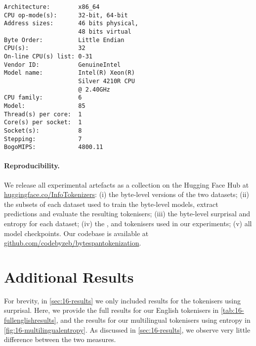 \begin{tcolorbox}[left=5pt,right=5pt,top=5pt,bottom=5pt]
    \small
    \begin{verbatim}
Architecture:        x86_64
CPU op-mode(s):      32-bit, 64-bit
Address sizes:       46 bits physical, 
                     48 bits virtual
Byte Order:          Little Endian
CPU(s):              32
On-line CPU(s) list: 0-31
Vendor ID:           GenuineIntel
Model name:          Intel(R) Xeon(R)
                     Silver 4210R CPU
                     @ 2.40GHz
CPU family:          6
Model:               85
Thread(s) per core:  1
Core(s) per socket:  1
Socket(s):           8
Stepping:            7
BogoMIPS:            4800.11
\end{verbatim}
\end{tcolorbox}


\paragraph{Reproducibility.}

We release all experimental artefacts as a collection on the Hugging Face Hub at \href{https://huggingface.co/InfoTokenizers}{huggingface.co/InfoTokenizers}: (i) the byte-level versions of the two datasets; (ii) the subsets of each dataset used to train the byte-level models, extract predictions and evaluate the resulting tokenisers; (iii) the byte-level surprisal and entropy for each dataset; (iv) the \bpe, \bpewp and \tokname tokenisers used in our experiments; (v) all model checkpoints. Our codebase is available at \href{https://github.com/codebyzeb/bytespantokenization}{github.com/codebyzeb/bytespantokenization}.

\section{Additional Results}
\label{app:additional_results}

For brevity, in \cref{sec:16-results} we only included results for the \tokname tokenisers using surprisal. Here, we provide the full results for our English tokenisers in \cref{tab:16-fullenglishresults}, and the results for our multilingual tokenisers using entropy in \cref{fig:16-multilingualentropy}. As discussed in \cref{sec:16-results}, we observe very little difference between the two measures.


